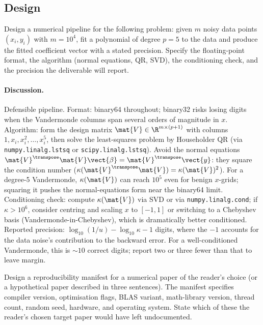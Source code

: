 \subsection*{Design}

\begin{exercise}
Design a numerical pipeline for the following problem: given $m$
noisy data points $(x_{i}, y_{i})$ with $m = 10^{4}$, fit a
polynomial of degree $p = 5$ to the data and produce the fitted
coefficient vector with a stated precision. Specify the
floating-point format, the algorithm (normal equations, QR, SVD),
the conditioning check, and the precision the deliverable will
report.
\end{exercise}

\paragraph{Discussion.}
Defensible pipeline. Format: binary64 throughout; binary32 risks
losing digits when the Vandermonde columns span several orders of
magnitude in $x$. Algorithm: form the design matrix $\mat{V} \in
\R^{m \times (p+1)}$ with columns $1, x_{i}, x_{i}^{2}, \ldots,
x_{i}^{5}$, then solve the least-squares problem by Householder QR
(via \texttt{numpy.linalg.lstsq} or \texttt{scipy.linalg.lstsq}).
Avoid the normal equations $\mat{V}^{\transpose}\mat{V}
\vect{\beta} = \mat{V}^{\transpose}\vect{y}$: they square the
condition number ($\kappa(\mat{V}^{\transpose}\mat{V}) =
\kappa(\mat{V})^{2}$). For a degree-5 Vandermonde, $\kappa(\mat{V})$
can reach $10^{5}$ even for benign $x$-grids; squaring it pushes
the normal-equations form near the binary64 limit. Conditioning
check: compute $\kappa(\mat{V})$ via SVD or via
\texttt{numpy.linalg.cond}; if $\kappa > 10^{6}$, consider
centring and scaling $x$ to $[-1, 1]$ or switching to a Chebyshev
basis (Vandermonde-in-Chebyshev), which is dramatically better
conditioned. Reported precision: $\log_{10}(1/u) - \log_{10}\kappa
- 1$ digits, where the $-1$ accounts for the data noise's
contribution to the backward error. For a well-conditioned
Vandermonde, this is $\sim 10$ correct digits; report two or three
fewer than that to leave margin.

\begin{exercise}
Design a reproducibility manifest for a numerical paper of the
reader's choice (or a hypothetical paper described in three
sentences). The manifest specifies compiler version, optimisation
flags, BLAS variant, math-library version, thread count, random
seed, hardware, and operating system. State which of these the
reader's chosen target paper would have left undocumented.
\end{exercise}

